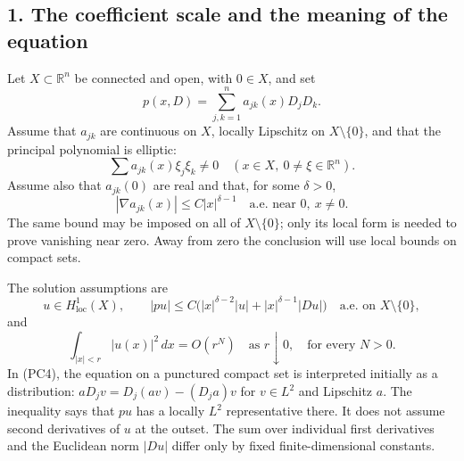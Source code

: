 \documentclass[
  11pt,
]{article}
\makeatletter
\let\ReaderOriginalAnchorStart\hyper@anchorstart
\let\ReaderOriginalAnchorEnd\hyper@anchorend
\let\ReaderPendingAliases\@empty
\def\ReaderArmAliases#1{\gdef\ReaderPendingAliases{#1}}
\def\hyper@anchorstart#1{\ReaderIfNativeAnchorTF{#1}{\ReaderPendingAliases\global\let\ReaderPendingAliases\@empty}{}\ReaderOriginalAnchorStart{#1}}
\makeatother
\begin{document}
\ReaderArmAliases{\ReaderOriginalAnchorStart{AN03-PCU-001}\ReaderOriginalAnchorEnd\begingroup\expandafter\def\csname @currentHref\endcsname{AN03-PCU-001}\label{AN03-PCU-001}\endgroup\ReaderOriginalAnchorStart{an03-pcu-001-the-coefficient-scale-and-the-meaning-of-the-equation}\ReaderOriginalAnchorEnd\begingroup\expandafter\def\csname @currentHref\endcsname{an03-pcu-001-the-coefficient-scale-and-the-meaning-of-the-equation}\label{an03-pcu-001-the-coefficient-scale-and-the-meaning-of-the-equation}\endgroup\ReaderOriginalAnchorStart{1-the-coefficient-scale-and-the-meaning-of-the-equation}\ReaderOriginalAnchorEnd\begingroup\expandafter\def\csname @currentHref\endcsname{1-the-coefficient-scale-and-the-meaning-of-the-equation}\label{1-the-coefficient-scale-and-the-meaning-of-the-equation}\endgroup\ReaderOriginalAnchorStart{the-coefficient-scale-and-the-meaning-of-the-equation}\ReaderOriginalAnchorEnd}
\subsection{1. The coefficient scale and the meaning of the
equation}\label{the-coefficient-scale-and-the-meaning-of-the-equation}

Let \(X\subset\mathbb R^n\) be connected and open, with \(0\in X\), and
set \[
p(x,D)=\sum_{j,k=1}^n a_{jk}(x)D_jD_k.
\tag{PC1}
\] Assume that \(a_{jk}\) are continuous on \(X\), locally Lipschitz on
\(X\setminus\{0\}\), and that the principal polynomial is elliptic: \[
\sum a_{jk}(x)\xi_j\xi_k\ne0
\quad(x\in X,\ 0\ne\xi\in\mathbb R^n).
\tag{PC2}
\] Assume also that \(a_{jk}(0)\) are real and that, for some
\(\delta>0\), \[
|\nabla a_{jk}(x)|\leq C|x|^{\delta-1}
\quad\text{a.e. near }0,\ x\ne0.
\tag{PC3}
\] The same bound may be imposed on all of \(X\setminus\{0\}\); only its
local form is needed to prove vanishing near zero. Away from zero the
conclusion will use local bounds on compact sets.

The solution assumptions are \[
u\in H^1_{\mathrm{loc}}(X),\qquad
|pu|\leq C\bigl(|x|^{\delta-2}|u|
                  +|x|^{\delta-1}|Du|\bigr)
\quad\text{a.e. on }X\setminus\{0\},
\tag{PC4}
\] and \[
\int_{|x|<r}|u(x)|^2\,dx=O(r^N)
\quad\text{as }r\downarrow0,\quad\text{for every }N>0.
\tag{PC5}
\] In (PC4), the equation on a punctured compact set is interpreted
initially as a distribution: \(aD_jv=D_j(av)-(D_ja)v\) for \(v\in L^2\)
and Lipschitz \(a\). The inequality says that \(pu\) has a locally
\(L^2\) representative there. It does not assume second derivatives of
\(u\) at the outset. The sum over individual first derivatives and the
Euclidean norm \(|Du|\) differ only by fixed finite-dimensional
constants.
\end{document}
